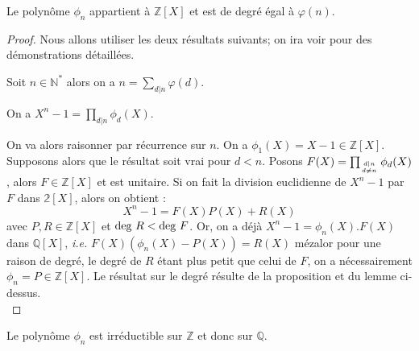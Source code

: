 \documentclass[a4paper]{article} %
\numberwithin{equation}{section}
\begin{document}
\begin{prop}
Le polynôme $\phi_n$ appartient à $\mathbb{Z}[X]$ et est de degré égal à $\varphi(n)$.
\end{prop}
\begin{proof}
Nous allons utiliser les deux résultats suivants; on ira voir \cite[p.~72, 80]{Per} pour des démonstrations détaillées.

\begin{lem}
Soit $n\in\mathbb{N}^*$ alors on a $n = \sum_{d|n}{\varphi(d)}$.
\end{lem}

\begin{prop}
On a $X^n - 1 = \prod_{d|n}{\phi_d(X)}$.
\end{prop}

On va alors raisonner par récurrence sur $n$. On a $\phi_1(X) = X-1 \in\mathbb{Z}[X]$. Supposons alors que le résultat soit vrai pour $d<n$. Posons $F(X) = \prod_{d|n\atop{d\neq n}}{\phi_d(X)}$, alors $F\in\mathbb{Z}[X]$ et est unitaire. Si on fait la division euclidienne de $X^n - 1$ par $F$ dans $\mathbb{2}[X]$, alors on obtient :
\[X^n - 1 = F(X)P(X) + R(X)\]
avec $P, R \in\mathbb{Z}[X]$ et $\textup{deg~}R < \textup{deg~}F$. Or, on a déjà $X^n - 1 = \phi_n(X).F(X)$ dans $\mathbb{Q}[X]$, \textit{i.e.} $F(X)(\phi_n(X) - P(X)) = R(X)$ mézalor pour une raison de degré, le degré de $R$ étant plus petit que celui de $F$, on a nécessairement $\phi_n = P \in\mathbb{Z}[X]$. Le résultat sur le degré résulte de la proposition et du lemme ci-dessus.\\
\end{proof}
\begin{thm}
Le polynôme $\phi_n$ est irréductible sur $\mathbb{Z}$ et donc sur $\mathbb{Q}$.
\end{thm}
\end{document}
